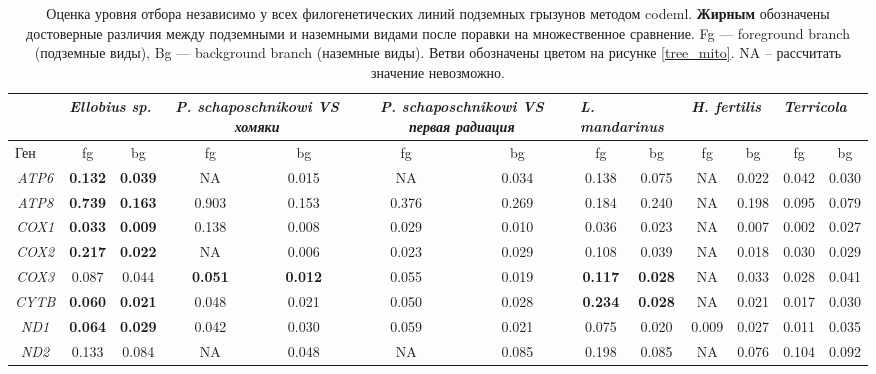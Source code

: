 \begin{landscape}
	
	\begin{table}[]
		\caption{Оценка уровня отбора независимо у всех филогенетических линий подземных грызунов методом codeml. \textbf{Жирным} обозначены достоверные различия между подземными и наземными видами после поравки на множественное сравнение. Fg --- foreground branch (подземные виды), Bg --- background branch (наземные виды). Ветви обозначены цветом на рисунке \ref{tree_mito}. NA -- рассчитать значение невозможно. }\label{MT_branch} \vspace{5mm}
		\large
		
		\begin{tabular}{|c|c|c|c|c|c|c|c|c|c|c|c|c|}
			\hline
			\multicolumn{1}{|l|}{}    & \multicolumn{2}{l|}{\textit{Ellobius sp.}} & \multicolumn{2}{p{5cm}|}{\textit{P. schaposchnikowi VS хомяки}} & \multicolumn{2}{p{5cm}|}{\textit{P. schaposchnikowi VS первая радиация}} & \multicolumn{2}{l|}{\textit{L. mandarinus}} & \multicolumn{2}{l|}{\textit{H. fertilis}} & \multicolumn{2}{l|}{\textit{Terricola}} \\ \hline
			\multicolumn{1}{|l|}{Ген} & fg & bg & fg & bg & fg & bg & fg & bg & fg & bg & fg & bg \\ \hline
			{\textit{ATP6}} & \textbf{0.132} & \textbf{0.039} & NA & 0.015 & NA & 0.034 & 0.138 & 0.075 & NA & 0.022 & 0.042 & 0.030 \\ \hline
			\textit{ATP8} & \textbf{0.739} & \textbf{0.163} & 0.903 & 0.153 & 0.376 & 0.269 & 0.184 & 0.240 & NA & 0.198 & 0.095& 0.079 \\ \hline
			\textit{COX1} & \textbf{0.033} & \textbf{0.009} & 0.138 & 0.008 & 0.029 & 0.010 & 0.036 & 0.023 & NA & 0.007 & 0.002& 0.027 \\ \hline
			\textit{COX2} & \textbf{0.217} & \textbf{0.022} & NA & 0.006 & 0.023 & 0.029 & 0.108 & 0.039 & NA & 0.018 & 0.030& 0.029 \\ \hline
			\textit{COX3} & 0.087 & 0.044 & \textbf{0.051} & \textbf{0.012} & 0.055 & 0.019 & \textbf{0.117} & \textbf{0.028} & NA & 0.033 & 0.028& 0.041 \\ \hline
			\textit{CYTB} & \textbf{0.060} & \textbf{0.021} & 0.048 & 0.021 & 0.050 & 0.028 & \textbf{0.234} & \textbf{0.028} & NA & 0.021 & 0.017& 0.030 \\ \hline
			\textit{ND1} & \textbf{0.064} & \textbf{0.029} & 0.042 & 0.030 & 0.059 & 0.021 & 0.075 & 0.020 & 0.009 & 0.027 & 0.011& 0.035 \\ \hline
			{\textit{ND2}} & 0.133 & 0.084 & NA & 0.048 & NA & 0.085 & 0.198 & 0.085 & NA & 0.076 & 0.104& 0.092 \\ \hline

\end{tabular}
\end{table}
\end{landscape}
